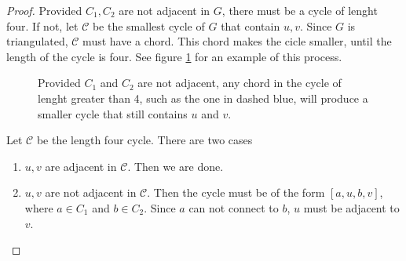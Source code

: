 \begin{proof}
	Provided $C_1, C_2$ are not adjacent in $G$, there must be a cycle of lenght four.
	If not, let $\mathcal{C}$ be the smallest cycle of $G$ that contain $u, v$.
	Since $G$ is triangulated, $\mathcal{C}$ must have a chord.
	This chord makes the cicle smaller, until the length of the cycle is four.
	See figure \ref{fig:triangulated_cycle} for an example of this process.

	\begin{figure}[ht]
		\centering
		
		\caption{Provided $C_1$ and $C_2$ are not adjacent, any chord in the cycle of lenght greater than 4, such as the one in dashed blue, will produce a smaller cycle that still contains $u$ and $v$.}
		\label{fig:triangulated_cycle}
	\end{figure}
	
	Let $\mathcal{C}$ be the length four cycle. There are two cases 
	\begin{enumerate}
		\item $u, v$ are adjacent in $\mathcal{C}$. Then we are done.
		\item $u, v$ are not adjacent in $\mathcal{C}$. Then the cycle must be of the form
		$[a, u, b, v]$, where $a \in C_1$ and $b \in C_2$. Since $a$ can not connect to $b$, $u$ must be adjacent to $v$.
	\end{enumerate}
\end{proof}

